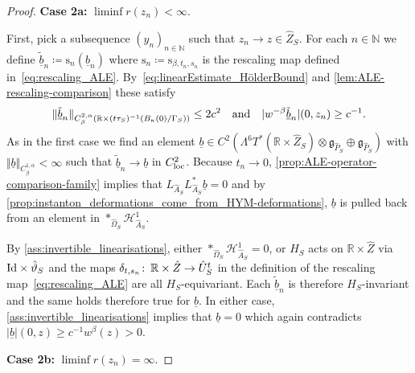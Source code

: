 \documentclass[11pt,a4paper]{scrartcl}
\newcommand{\col}{\colon \thinspace}
\newcommand{\VertWH}[3]{\Vert_{C^{{#1},\alpha}_{{#2}}{#3}}}
\numberwithin{equation}{section}
\theoremstyle{plain}
\theoremstyle{definition}
\theoremstyle{remark}
\begin{document}
\begin{proof}
\noindent \textbf{Case 2a:} $\liminf r(z_n) < \infty$.

First, pick a subsequence $(y_n)_{n\in \mathbb{N}}$ such that $z_n \to z \in \hat{Z}_S$. For each $n\in \mathbb{N}$ we define $\tilde{\underline{b}}_n \coloneqq \mathrm{s}_n(\underline{b}_n)$ where $\mathrm{s}_n \coloneqq \mathrm{s}_{\beta,t_n,s_n}$ is the rescaling map defined in~\eqref{eq:rescaling_ALE}. By~\eqref{eq:linearEstimate_HölderBound} and \autoref{lem:ALE-rescaling-comparison} these satisfy \[  \Vert \tilde{\underline{b}}_n \VertWH{2}{\beta}{(\mathbb{R}\times (t\tau_S)^{-1}(B_\kappa(0)/\Gamma_S))} \leq 2c^2  \quad \textup{and} \quad \vert w^{-\beta} \tilde{\underline{b}}_n \vert (0,z_n)  \geq c^{-1}.\] As in the first case we find an element $\underline{b} \in C^{2}(\Lambda^6T^*(\mathbb{R} \times \hat{Z}_S)\otimes \mathfrak{g}_{\hat{P}_S} \oplus \mathfrak{g}_{\hat{P}_S})$ with $\Vert \underline{b}\VertWH{1}{\beta}{}< \infty$ such that $\tilde{\underline{b}}_n \to \underline{b}$ in $C^{2}_{\textup{loc}}$. Because $t_n \to 0$, \autoref{prop:ALE-operator-comparison-family} implies that $L_{\hat{A}_S}L_{\hat{A}_S}^* \underline{b} = 0$ and by \autoref{prop:instanton_deformations_come_from_HYM-deformations}, $\underline{b}$ is pulled back from an element in $*_{\hat{\Omega}_S}\mathcal{H}^1_{\hat{A}_S}$. 

By \autoref{ass:invertible_linearisations}, either $*_{\hat{\Omega}_S} \mathcal{H}^1_{\hat{A}_S}= 0$, or $H_S$ acts on $\mathbb{R}\times \hat{Z}$ via $\textup{Id} \times \hat{\vartheta}_S$ and the maps $\delta_{t,s_n} \col \mathbb{R}\times \hat{Z} \to \hat{U}^t_S$ in the definition of the rescaling map~\eqref{eq:rescaling_ALE} are all $H_S$-equivariant. Each $\tilde{\underline{b}}_n$ is therefore $H_S$-invariant and the same holds therefore true for $\underline{b}$. In either case, \autoref{ass:invertible_linearisations} implies that $\underline{b}=0$ which again contradicts $\vert \underline{b}\vert (0,z) \geq c^{-1}w^\beta(z) >0$.

\noindent \textbf{Case 2b:} $\liminf r(z_n) = \infty$.


\end{proof}
\end{document}
